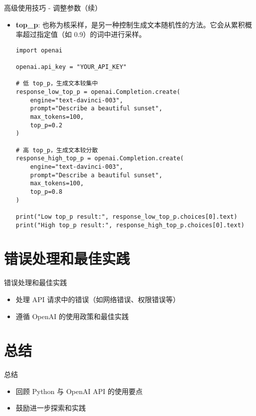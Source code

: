 \documentclass{beamer}
\begin{document}
\begin{frame}{高级使用技巧 - 调整参数（续）}
    \begin{itemize}
        \item \textbf{top_p}: 也称为核采样，是另一种控制生成文本随机性的方法。它会从累积概率超过指定值（如 0.9）的词中进行采样。
        \begin{lstlisting}[style=pythonstyle]
import openai

openai.api_key = "YOUR_API_KEY"

# 低 top_p，生成文本较集中
response_low_top_p = openai.Completion.create(
    engine="text-davinci-003",
    prompt="Describe a beautiful sunset",
    max_tokens=100,
    top_p=0.2
)

# 高 top_p，生成文本较分散
response_high_top_p = openai.Completion.create(
    engine="text-davinci-003",
    prompt="Describe a beautiful sunset",
    max_tokens=100,
    top_p=0.8
)

print("Low top_p result:", response_low_top_p.choices[0].text)
print("High top_p result:", response_high_top_p.choices[0].text)
        \end{lstlisting}
    \end{itemize}
\end{frame}

\section{错误处理和最佳实践}
\begin{frame}{错误处理和最佳实践}
    \begin{itemize}
        \item 处理 API 请求中的错误（如网络错误、权限错误等）
        \item 遵循 OpenAI 的使用政策和最佳实践
    \end{itemize}
\end{frame}

\section{总结}
\begin{frame}{总结}
    \begin{itemize}
        \item 回顾 Python 与 OpenAI API 的使用要点
        \item 鼓励进一步探索和实践
    \end{itemize}
\end{frame}
\end{document}
